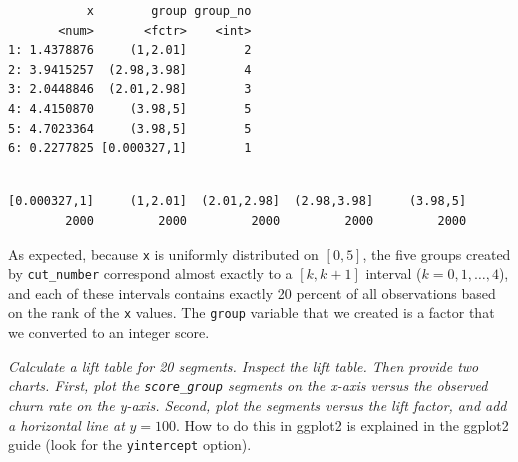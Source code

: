 \documentclass[
]{article}
\newenvironment{Shaded}{\begin{snugshade}}{\end{snugshade}}
\newcommand{\FunctionTok}[1]{\textcolor[rgb]{0.13,0.29,0.53}{\textbf{#1}}}
\newcommand{\NormalTok}[1]{#1}
\newcommand{\SpecialCharTok}[1]{\textcolor[rgb]{0.81,0.36,0.00}{\textbf{#1}}}
\begin{document}
\begin{verbatim}
           x        group group_no
       <num>       <fctr>    <int>
1: 1.4378876     (1,2.01]        2
2: 3.9415257  (2.98,3.98]        4
3: 2.0448846  (2.01,2.98]        3
4: 4.4150870     (3.98,5]        5
5: 4.7023364     (3.98,5]        5
6: 0.2277825 [0.000327,1]        1
\end{verbatim}

\begin{Shaded}
\end{Shaded}

\begin{verbatim}

[0.000327,1]     (1,2.01]  (2.01,2.98]  (2.98,3.98]     (3.98,5] 
        2000         2000         2000         2000         2000 
\end{verbatim}

\medskip

As expected, because \texttt{x} is uniformly distributed on \([0,5]\),
the five groups created by \texttt{cut\_number} correspond almost
exactly to a \([k,k+1]\) interval (\(k=0,1,\dots,4\)), and each of these
intervals contains exactly 20 percent of all observations based on the
rank of the \texttt{x} values. The \texttt{group} variable that we
created is a factor that we converted to an integer score.

\bigskip

\emph{Calculate a lift table for 20 segments. Inspect the lift table.
Then provide two charts. First, plot the \texttt{score\_group} segments
on the x-axis versus the observed churn rate on the y-axis. Second, plot
the segments versus the lift factor, and add a horizontal line at}
\(y=100\). How to do this in ggplot2 is explained in the ggplot2 guide
(look for the \texttt{yintercept} option).
\end{document}
